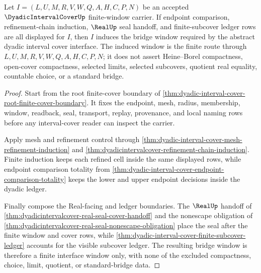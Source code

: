 \begin{theorem}
\label{thm:dyadic-interval-cover-bridge-window}
Let $I=(L,U,M,R,V,W,Q,A,H,C,P,N)$ be an accepted $\DyadicIntervalCoverUp$ finite-window carrier. If endpoint comparison, refinement-chain induction, $\RealUp$ seal handoff, and finite-subcover ledger rows are all displayed for $I$, then $I$ induces the bridge window required by the abstract dyadic interval cover interface. The induced window is the finite route through $L,U,M,R,V,W,Q,A,H,C,P,N$; it does not assert Heine--Borel compactness, open-cover compactness, selected limits, selected subcovers, quotient real equality, countable choice, or a standard bridge.
\end{theorem}
\begin{proof}
Start from the root finite-cover boundary of \autoref{thm:dyadic-interval-cover-root-finite-cover-boundary}. It fixes the endpoint, mesh, radius, membership, window, readback, seal, transport, replay, provenance, and local naming rows before any interval-cover reader can inspect the carrier.

Apply mesh and refinement control through \autoref{thm:dyadic-interval-cover-mesh-refinement-induction} and \autoref{thm:dyadicintervalcover-refinement-chain-induction}. Finite induction keeps each refined cell inside the same displayed rows, while endpoint comparison totality from \autoref{thm:dyadic-interval-cover-endpoint-comparison-totality} keeps the lower and upper endpoint decisions inside the dyadic ledger.

Finally compose the Real-facing and ledger boundaries. The $\RealUp$ handoff of \autoref{thm:dyadicintervalcover-real-seal-cover-handoff} and the nonescape obligation of \autoref{thm:dyadicintervalcover-real-seal-nonescape-obligation} place the seal after the finite window and cover rows, while \autoref{thm:dyadic-interval-cover-finite-subcover-ledger} accounts for the visible subcover ledger. The resulting bridge window is therefore a finite interface window only, with none of the excluded compactness, choice, limit, quotient, or standard-bridge data.
\end{proof}
